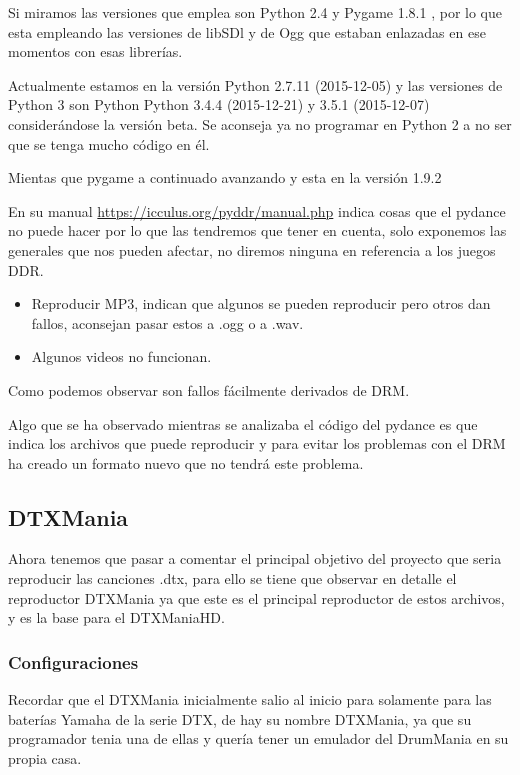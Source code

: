 \documentclass[a4paper,11pt,oneside]{book}
\begin{document}
Si miramos las versiones que emplea son Python 2.4 y Pygame 1.8.1 , por lo que esta empleando las versiones de libSDl y de Ogg que estaban enlazadas en ese momentos con esas librerías.

Actualmente estamos en la versión Python 2.7.11 (2015-12-05) y las versiones de Python 3 son Python Python 3.4.4 (2015-12-21) y 3.5.1 (2015-12-07) considerándose la versión beta.
Se aconseja ya no programar en Python 2 a no ser que se tenga mucho código en él.

Mientas que pygame a continuado avanzando y esta en la versión 1.9.2

En su manual \url{https://icculus.org/pyddr/manual.php} indica cosas que el pydance no puede hacer por lo que las tendremos que tener en cuenta, solo exponemos las generales que nos pueden afectar, no diremos ninguna en referencia a los juegos DDR.

\begin{itemize}
  \item Reproducir MP3, indican que algunos se pueden reproducir pero otros dan fallos, aconsejan pasar estos a .ogg o a .wav.
  \item Algunos videos no funcionan.
\end{itemize}

Como podemos observar son fallos fácilmente derivados de DRM.

Algo que se ha observado mientras se analizaba el código del pydance es que indica los archivos que puede reproducir y para evitar los problemas con el DRM ha creado un formato nuevo que no tendrá este problema.

\subsection{DTXMania}
Ahora tenemos que pasar a comentar el principal objetivo del proyecto que seria reproducir las canciones .dtx, para ello se tiene que observar en detalle el reproductor DTXMania ya que este es el principal reproductor de estos archivos, y es la base para el DTXManiaHD.

\subsubsection{Configuraciones} 
Recordar que el DTXMania inicialmente salio al inicio para solamente para las baterías Yamaha de la serie DTX, de hay su nombre DTXMania, ya que su programador tenia una de ellas y quería tener un emulador del DrumMania en su propia casa.
\end{document}
